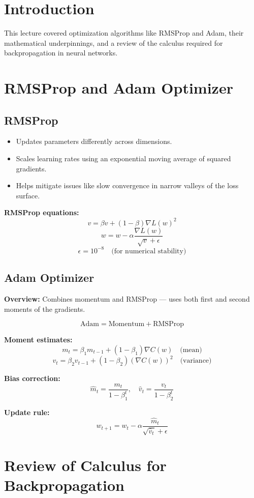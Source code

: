 \section{Introduction}
This lecture covered optimization algorithms like RMSProp and Adam, their mathematical underpinnings, and a review of the calculus required for backpropagation in neural networks.

\section{RMSProp and Adam Optimizer}

\subsection*{RMSProp}
\begin{itemize}
    \item Updates parameters differently across dimensions.
    \item Scales learning rates using an exponential moving average of squared gradients.
    \item Helps mitigate issues like slow convergence in narrow valleys of the loss surface.
\end{itemize}

\textbf{RMSProp equations:}
\[
v = \beta v + (1 - \beta) \nabla L(w)^2
\]
\[
w = w - \alpha \frac{\nabla L(w)}{\sqrt{v} + \epsilon}
\]
\[
\epsilon = 10^{-8} \quad \text{(for numerical stability)}
\]

\subsection*{Adam Optimizer}
\textbf{Overview:} Combines momentum and RMSProp — uses both first and second moments of the gradients.

\[
\text{Adam} = \text{Momentum} + \text{RMSProp}
\]

\textbf{Moment estimates:}
\[
m_t = \beta_1 m_{t-1} + (1 - \beta_1) \nabla C(w) \quad \text{(mean)}
\]
\[
v_t = \beta_2 v_{t-1} + (1 - \beta_2) (\nabla C(w))^2 \quad \text{(variance)}
\]

\textbf{Bias correction:}
\[
\hat{m}_t = \frac{m_t}{1 - \beta_1^t}, \quad \hat{v}_t = \frac{v_t}{1 - \beta_2^t}
\]

\textbf{Update rule:}
\[
w_{t+1} = w_t - \alpha \frac{\hat{m}_t}{\sqrt{\hat{v}_t} + \epsilon}
\]

\section{Review of Calculus for Backpropagation}

